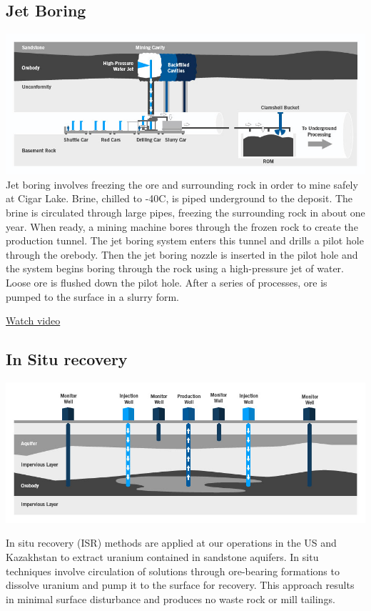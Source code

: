 \subsection*{Jet Boring}
\includegraphics{img/cameco/3.0.1-2MiningMethods-JetBore.jpg}
Jet boring involves freezing the ore and surrounding rock in order to mine safely at Cigar Lake. Brine, chilled to -40C, is piped underground to the deposit. The brine is circulated through large pipes, freezing the surrounding rock in about one year. When ready, a mining machine bores through the frozen rock to create the production tunnel. The jet boring system enters this tunnel and drills a pilot hole through the orebody. Then the jet boring nozzle is inserted in the pilot hole and the system begins boring through the rock using a high-pressure jet of water. Loose ore is flushed down the pilot hole. After a series of processes, ore is pumped to the surface in a slurry form.

\href{https://www.cameco.com/businesses/mining-methods/jet-boring-video}{Watch video}
\subsection*{In Situ recovery}
\includegraphics{img/cameco/3.0.1-3MiningMethods-ISR.jpg}

In situ recovery (ISR) methods are applied at our operations in the US and Kazakhstan to extract uranium contained in sandstone aquifers. In situ techniques involve circulation of solutions through ore-bearing formations to dissolve uranium and pump it to the surface for recovery. This approach results in minimal surface disturbance and produces no waste rock or mill tailings.

